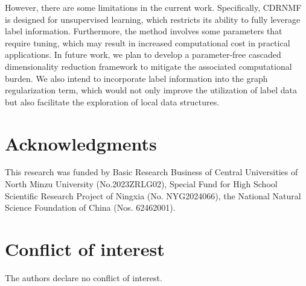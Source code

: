 \documentclass[a4paper,fleqn]{cas-sc}
\begin{document}
However, there are some limitations in the current work. Specifically, CDRNMF is designed for unsupervised learning, which restricts its ability to fully leverage label information. Furthermore, the method involves some parameters that require tuning, which may result in increased computational cost in practical applications. In future work, we plan to develop a parameter-free cascaded dimensionality reduction framework to mitigate the associated computational burden. We also intend to incorporate label information into the graph regularization term, which would not only improve the utilization of label data but also facilitate the exploration of local data structures.

\section*{Acknowledgments}
This research was funded by Basic Research Business of Central Universities of North Minzu University (No.2023ZRLG02), Special Fund for High School Scientific Research Project of Ningxia (No. NYG2024066), the National Natural Science Foundation of China (Nos. 62462001).

\section*{Conflict of interest} 
The authors declare no conflict of interest.



%




\end{document}
